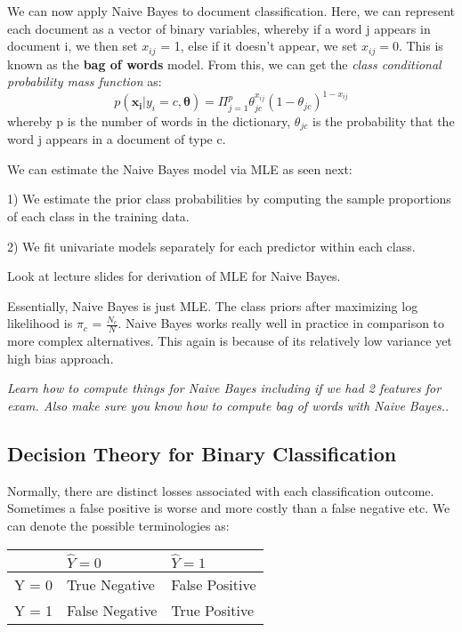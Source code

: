 \documentclass[11pt, oneside]{article}
\theoremstyle{definition}
\begin{document}
We can now apply Naive Bayes to document classification. Here, we can represent each document as a vector of binary variables, whereby if a word j appears in document i, we then set $x_{ij}$ = 1, else if it doesn't appear, we set $x_{ij} = 0$. This is known as the \textbf{bag of words} model. From this, we can get the \textit{class conditional probability mass function} as:
$$
p(\bm{x_i}|y_i = c, \bm{\theta}) = \Pi_{j=1}^{p}\theta_{jc}^{x_{ij}}(1-\theta_{jc})^{1-x_{ij}}
$$
whereby p is the number of words in the dictionary, $\theta_{jc}$ is the probability that the word j appears in a document of type c.

We can estimate the Naive Bayes model via MLE as seen next:

1) We estimate the prior class probabilities by computing the sample proportions of each class in the training data.

2) We fit univariate models separately for each predictor within each class.

Look at lecture slides for derivation of MLE for Naive Bayes.

Essentially, Naive Bayes is just MLE. The class priors after maximizing log likelihood is $\pi_c$ = $\frac{N_c}{N}$. Naive Bayes works really well in practice in comparison to more complex alternatives. This again is because of its relatively low variance yet high bias approach.


\textit{Learn how to compute things for Naive Bayes including if we had 2 features for exam. Also make sure you know how to compute bag of words with Naive Bayes.}.

\subsection{Decision Theory for Binary Classification}
Normally, there are distinct losses associated with each classification outcome. Sometimes a false positive is worse and more costly than a false negative etc. We can denote the possible terminologies as:

\begin{center}
\begin{tabu} to 0.8\textwidth { | X[l] | X[c] | X[r] | }
 \hline
  & $\hat{Y} = 0$  & $\hat{Y} = 1$ \\
 \hline
 Y = 0  & True Negative  & False Positive  \\
\hline
 Y = 1  & False Negative  & True Positive  \\
\hline
\end{tabu}
\end{center}
\end{document}

